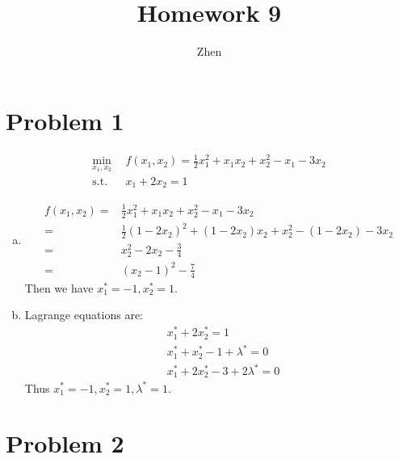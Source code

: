\documentclass{article}
\begin{document}
\title{Homework 9}
\author{Zhen}
\maketitle

\section*{Problem 1}
$$
\begin{aligned}
	\min_{x_1,x_2}\ \ 
	&f(x_1,x_2)=\frac{1}{2}x_1^2+x_1x_2+x_2^2-x_1-3x_2
	\\
	\mbox{s.t.   }&x_1+2x_2=1
\end{aligned}
$$

\begin{enumerate}[(a)]
	\item 
		\[
		    \begin{aligned}
				f(x_1,x_2)=&
				\frac{1}{2}x_1^2+x_1x_2+x_2^2-x_1-3x_2
				\\=&
				\frac{1}{2}(1-2x_2)^2+(1-2x_2)x_2+x_2^2-(1-2x_2)-3x_2
				\\=&
				x_2^2-2x_2-\frac{3}{4}
				\\=&
				(x_2-1)^2-\frac{7}{4}
		    \end{aligned}
		\]
		Then we have $x^*_1=-1,x^*_2=1$.
	\item
		Lagrange equations are:
		\[
		    \begin{aligned}
		        &x^*_1+2x^*_2=1
				\\&
				x_1^*+x_2^*-1+\lambda^*=0
				\\&
				x_1^*+2x_2^*-3+2\lambda^*=0
		    \end{aligned}
		\]
		Thus $x_1^*=-1,x_2^*=1,\lambda^*=1$.
\end{enumerate}

\section*{Problem 2}
\end{document}
